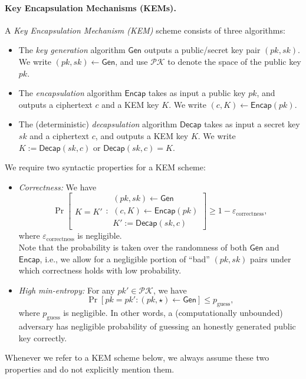 \documentclass{article}
\theoremstyle{plain}
\theoremstyle{definition}
\theoremstyle{remark}
\newcommand{\pkspace}{\mathcal{PK}}
\newcommand{\Gen}{\mathsf{Gen}}
\newcommand{\Encap}{\mathsf{Encap}}
\newcommand{\Decap}{\mathsf{Decap}}
\begin{document}
\paragraph{Key Encapsulation Mechanisms (KEMs).}
A \emph{Key Encapsulation Mechanism (KEM)} scheme consists of three algorithms:
\begin{itemize}
  \item The \emph{key generation} algorithm $\Gen$ outputs a public/secret key pair $(pk,sk)$. We write $(pk,sk) \gets \Gen$, and use $\pkspace$ to denote the space of the public key $pk$.
  \item The \emph{encapsulation} algorithm $\Encap$ takes as input a public key $pk$, and outputs a ciphertext $c$ and a KEM key $K$. We write $(c,K) \gets \Encap(pk)$.
  \item The (deterministic) \emph{decapsulation} algorithm $\Decap$ takes as input a secret key $sk$ and a ciphertext $c$, and outputs a KEM key $K$. We write $K := \Decap(sk,c)$ or $\Decap(sk,c) = K$.
\end{itemize}

We require two syntactic properties for a KEM scheme:
\begin{itemize}
  \item \emph{Correctness:} We have
      \[
      \operatorname{Pr}
      \left[
      \begin{array}{c}
      K = K'
      \end{array}
      :
      \begin{array}{c}
      (pk,sk) \gets \Gen \\
      (c,K) \gets \Encap(pk) \\
      K' := \Decap(sk,c)
      \end{array}
      \right] \geq 1-\varepsilon_\text{correctness},
      \]
      where $\varepsilon_\text{correctness}$ is negligible. \\
      Note that the probability is taken over the randomness of both $\Gen$ and $\Encap$, i.e., we allow for a negligible portion of ``bad'' $(pk,sk)$ pairs under which correctness holds with low probability.
  \item \emph{High min-entropy:} For any $pk' \in \pkspace$, we have
      \[
      \Pr[pk = pk' : (pk,\star) \gets \Gen] \leq p_\text{guess},
      \]
      where $p_\text{guess}$ is negligible. In other words, a (computationally unbounded) adversary has negligible probability of guessing an honestly generated public key correctly.
\end{itemize}
Whenever we refer to a KEM scheme below, we always assume these two properties and do not explicitly mention them.
\end{document}
